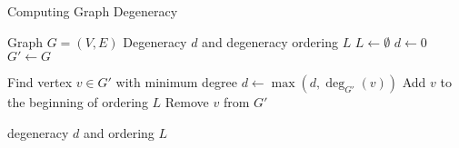 \documentclass{article}
\theoremstyle{definition}
\begin{document}
\pagebreak
\newpage
\clearpage

\begin{algorithm}
\caption{Computing Graph Degeneracy}
\label{alg:degeneracy}
\begin{algorithmic}[1]
    \Require Graph $G = (V, E)$
    \Ensure Degeneracy $d$ and degeneracy ordering $L$
    \State $L \gets \emptyset$ 
    \State $d \gets 0$ 
    \State $G' \gets G$ 
    
        \State Find vertex $v \in G'$ with minimum degree
        \State $d \gets \max(d, \deg_{G'}(v))$ 
        \State Add $v$ to the beginning of ordering $L$
        \State Remove $v$ from $G'$
    \EndWhile
    
    \State \Return degeneracy $d$ and ordering $L$
\end{algorithmic}
\end{algorithm}
\end{document}
